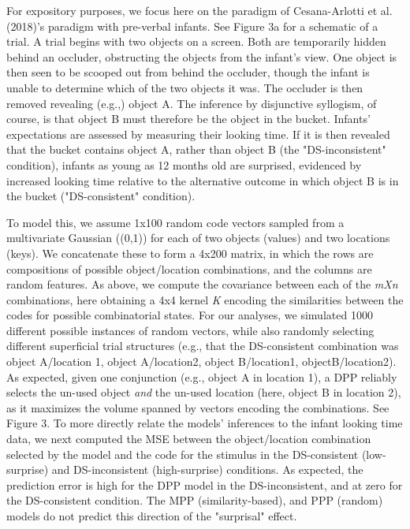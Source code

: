 \documentclass[10pt,letterpaper]{article}
\begin{document}
For expository purposes, we focus here on the paradigm of Cesana-Arlotti et al. (2018)'s paradigm with pre-verbal infants. See Figure 3a for a schematic of a trial. A trial begins with two objects on a screen. Both are temporarily hidden behind an occluder, obstructing the objects from the infant's view. One object is then seen to be scooped out from behind the occluder, though the infant is unable to determine which of the two objects it was. The occluder is then removed revealing (e.g.,) object A.  The inference by disjunctive syllogism, of course, is that object B must therefore be the object in the bucket. Infants' expectations are assessed by measuring their looking time. If it is then revealed that the bucket contains object A, rather than object B (the "DS-inconsistent" condition), infants as young as 12 months old are surprised, evidenced by increased looking time relative to the alternative outcome in which object B is in the bucket ("DS-consistent" condition).

To model this, we assume 1x100 random code vectors sampled from a multivariate Gaussian ((0,1)) for each of two objects (values) and two locations (keys). We concatenate these to form a 4x200 matrix, in which the rows are compositions of possible object/location combinations, and the columns are random features. As above, we compute the covariance between each of the \textit{mXn} combinations, here obtaining a 4x4 kernel \textit{K} encoding the similarities between the codes for possible combinatorial states. For our analyses, we simulated 1000 different possible instances of random vectors, while also randomly selecting different superficial trial structures (e.g., that the DS-consistent combination was object A/location 1, object A/location2, object B/location1, objectB/location2). As expected, given one conjunction (e.g., object A in location 1), a DPP reliably selects the un-used object \textit{and} the un-used location (here, object B in location 2), as it maximizes the volume spanned by vectors encoding the combinations. See Figure 3. To more directly relate the models' inferences to the infant looking time data, we next computed the MSE between the object/location combination selected by the model and the code for the stimulus in the DS-consistent (low-surprise) and DS-inconsistent (high-surprise) conditions. As expected, the prediction error is high for the DPP model in the DS-inconsistent, and at zero for the DS-consistent condition. The MPP (similarity-based), and PPP (random) models do not predict this direction of the "surprisal" effect.
\end{document}
